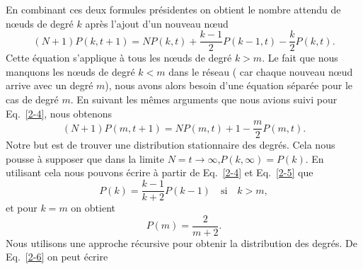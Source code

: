 En combinant ces deux formules présidentes on obtient le nombre attendu de nœuds de degré $k$ après l'ajout d'un nouveau nœud
\begin{equation}
(N+1)P(k,t+1)=NP(k,t)+\frac{k-1}{2}P(k-1,t)-\frac{k}{2}P(k,t).
\label{2-4}
\end{equation}
Cette équation s'applique à tous les nœuds de degré $k>m$. Le fait que nous manquons les nœuds de degré $k<m$ dans le réseau ( car chaque nouveau nœud arrive avec un degré $m$), nous avons alors besoin d'une équation séparée pour le cas de degré $m$. En suivant les mêmes arguments que nous avions suivi pour Eq.~\eqref{2-4}, nous obtenons
\begin{equation}
(N+1)P(m,t+1)=NP(m,t)+1-\frac{m}{2}P(m,t).
\label{2-5}
\end{equation}
Notre but est de trouver une distribution stationnaire des degrés. Cela nous pousse à supposer que dans la limite $N=t\longrightarrow \infty$,$P(k,\infty)=P(k)$. En utilisant cela nous pouvons écrire à partir de Eq.~\eqref{2-4} et Eq.~\eqref{2-5} que
\begin{equation}
P(k)=\frac{k-1}{k+2}P(k-1) \quad \text{si}\quad k>m,
\label{2-6}
\end{equation}
et pour $k=m$ on obtient
\begin{equation}
P(m)=\frac{2}{m+2}.
\end{equation}
Nous utilisons une approche récursive pour obtenir la distribution des degrés. De Eq.~\eqref{2-6} on peut écrire

